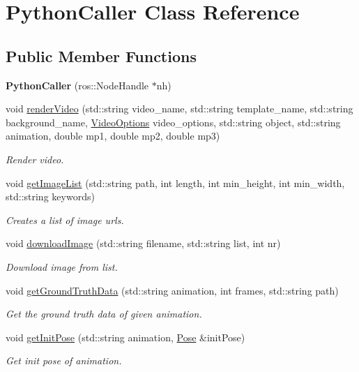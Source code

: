 \hypertarget{classPythonCaller}{}\section{Python\+Caller Class Reference}
\label{classPythonCaller}
\subsection*{Public Member Functions}
\begin{DoxyCompactItemize}
\item 
{\bfseries Python\+Caller} (ros\+::\+Node\+Handle $\ast$nh)\hypertarget{classPythonCaller_a17b5967b8cb382fa420dee33870a186a}{}\label{classPythonCaller_a17b5967b8cb382fa420dee33870a186a}

\item 
void \hyperlink{classPythonCaller_a2f996721a3cddabbfb9181d826fc9335}{render\+Video} (std\+::string video\+\_\+name, std\+::string template\+\_\+name, std\+::string background\+\_\+name, \hyperlink{structVideoOptions}{Video\+Options} video\+\_\+options, std\+::string object, std\+::string animation, double mp1, double mp2, double mp3)
\begin{DoxyCompactList}\small\item\em Render video. \end{DoxyCompactList}\item 
void \hyperlink{classPythonCaller_a2edcddb9119570ee95b2f4fb6e18c58c}{get\+Image\+List} (std\+::string path, int length, int min\+\_\+height, int min\+\_\+width, std\+::string keywords)
\begin{DoxyCompactList}\small\item\em Creates a list of image urls. \end{DoxyCompactList}\item 
void \hyperlink{classPythonCaller_a6217d7fc3432b3464c274b3fe2c5c539}{download\+Image} (std\+::string filename, std\+::string list, int nr)
\begin{DoxyCompactList}\small\item\em Download image from list. \end{DoxyCompactList}\item 
void \hyperlink{classPythonCaller_a4a7706b979cfe9aa45f1dcbc80d9a942}{get\+Ground\+Truth\+Data} (std\+::string animation, int frames, std\+::string path)
\begin{DoxyCompactList}\small\item\em Get the ground truth data of given animation. \end{DoxyCompactList}\item 
void \hyperlink{classPythonCaller_a690a2ad68abc1dc354eb74b9c58e65e7}{get\+Init\+Pose} (std\+::string animation, \hyperlink{structPose}{Pose} \&init\+Pose)
\begin{DoxyCompactList}\small\item\em Get init pose of animation. \end{DoxyCompactList}\end{DoxyCompactItemize}


